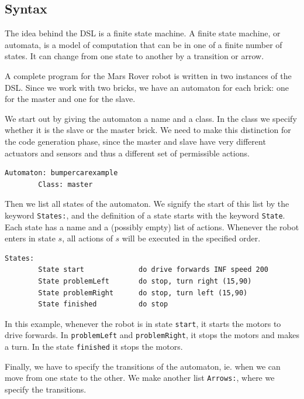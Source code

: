 \documentclass[11pt,a4paper]{article}
\begin{document}
\subsection{Syntax} 
The idea behind the DSL is a finite state machine. 
A finite state machine, or automata, is a model of computation that can be in one of a finite number of states. It can change from one state to another by a transition or arrow.

A complete program for the Mars Rover robot is written in two instances of the DSL. Since we work with two bricks, we have an automaton for each brick: one for the master and one for the slave.

We start out by giving the automaton a name and a class. In the class we specify whether it is the slave or the master brick. We need to make this distinction for the code generation phase, since the master and slave have very different actuators and sensors and thus a different set of permissible actions.

\begin{verbatim}
Automaton: bumpercarexample
        Class: master
\end{verbatim}

Then we list all states of the automaton. 
We signify the start of this list by the keyword \texttt{States:}, and the definition of a state starts with the keyword \texttt{State}.
Each state has a name and a (possibly empty) list of actions. 
Whenever the robot enters in state $s$, all actions of $s$ will be executed in the specified order.

\begin{verbatim}
States: 
        State start             do drive forwards INF speed 200
        State problemLeft       do stop, turn right (15,90)
        State problemRight      do stop, turn left (15,90)
        State finished          do stop
\end{verbatim}

In this example, whenever the robot is in state \texttt{start}, it starts the motors to drive forwards. In \texttt{problemLeft} and \texttt{problemRight}, it stops the motors and makes a turn. In the state \texttt{finished} it stops the motors.

Finally, we have to specify the transitions of the automaton, ie. when we can move from one state to the other. We make another list \texttt{Arrows:}, where we specify the transitions.
\end{document}

